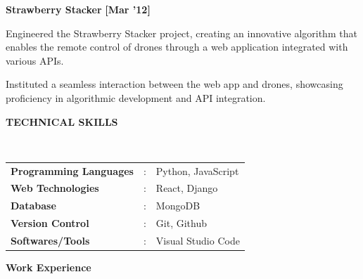 \documentclass[a4paper,10pt]{article}
\begin{document}
\begin{itemize*}
  \setlength{\itemsep}{1pt}
  \item \textbf{\small{Strawberry Stacker}} \hfill {\small{{\textbf{[Mar '12]}}}\/}
  \begin{itemize*}
    \item     Engineered the Strawberry Stacker project, creating an innovative algorithm that enables the remote control of drones through a web application integrated with various APIs.
    \item Instituted a seamless interaction between the web app and drones, showcasing proficiency in algorithmic development and API integration.
  \end{itemize*}
\end{itemize*}

\colorbox{titleColor}{\parbox{6.7in}{\textbf{TECHNICAL SKILLS}}}\\

\begin{tabular}{p{1.6in}p{0.1in}p{4.5in}}
  \textbf{\small{Programming Languages}} & : & {{Python, JavaScript}}  \\
  \textbf{\small{Web Technologies}}      & : & {{React, Django}}       \\
  \textbf{\small{Database}}              & : & {{MongoDB}}             \\
  \textbf{\small{Version Control}}       & : & {{Git, Github}}         \\
  \textbf{\small{Softwares/Tools}}       & : & {{ Visual Studio Code}} \\
\end{tabular}

\colorbox{titleColor}{\parbox{6.7in}{\textbf{Work Experience}}}
\end{document}
